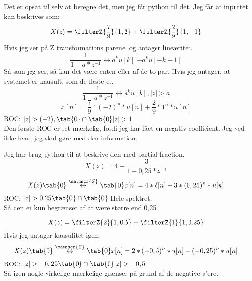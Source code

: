 \begin{Opgaver}
\begin{kapitel}[Z transformation]
\begin{Opgave}
            \begin{Udklip}
                \begin{UnderOpgave}[\text{$X(z) = \filterZ{1, -1/3}{1, 1, -2}$, ROC er hele spektret?}]
                    Det er opsat til selv at beregne det, men jeg får python til det. 
                    Jeg får at inputtet kan beskrives som: 
                    \[X(z) = \filterZ{\frac{7}{9}}{1, 2} + \filterZ{\frac{2}{9}}{1, -1}\]
                    Hvis jeg ser på Z transformations parene, og antager lineæritet. \\
                    \[\frac{1}{1 - a*z^{-1}} \leftrightarrow a^ku[k] | -a^ku[-k-1]\] 
                    Så som jeg ser, så kan det være enten eller af de to par. Hvis jeg antager, at systemet er kausult, som de fleste er. 
                    \[\frac{1}{1 - a*z^{-1}} \leftrightarrow a^ku[k], |z| > a\]
                    \[x[n] = \frac{7}{9} * (-2)^n * u[n] + \frac{2}{9} * 1^n * u[n] \]
                    ROC: $|z| > (-2),\tab{0}\cap\tab{0} |z| > 1$\\
                    Den første ROC er ret mærkelig, fordi jeg har fået en negativ coefficient. Jeg ved ikke hvad jeg skal gøre med den information.
                \end{UnderOpgave}
                \begin{UnderOpgave}[\text{$X(z) = \filterZ{1, -1}{1, 0.25}, \tab{0}$x[n] is causal}]
                    Jeg har brug python til at beskrive den med partial fraction.
                    \[X(z) = 4 - \frac{3}{1 - 0,25*z^{-1}}\]
                    \[X(z) \tab{0}\overset{\mathscr{Z}}{\leftrightarrow}\tab{0} x[n] = 4 * \delta[n] -  3*(0,25)^n * u[n]\]
                    ROC: $|z| > 0.25 \tab{0}\cap\tab{0}$ Hele spektret.\\ Så den er kun begrænset af at være større end 0,25. 
                \end{UnderOpgave}
                \begin{UnderOpgave}[\text{$X(z) = \filterZ{1}{1, 0.75, 0.125},\tab{0}$ x[n] is absolutely summable}]
                    \[X(z) = \filterZ{2}{1, 0.5} - \filterZ{1}{1, 0.25}\]
                    Hvis jeg antager kausulitet igen: 
                    \[X(z) \tab{0}\overset{\mathscr{Z}}{\leftrightarrow}\tab{0} x[n] = 2 * (-0,5)^n * u[n] - (-0,25)^n * u[n]\]
                    ROC: $|z| > -0,25 \tab{0}\cap\tab{0} |z| > -0,5$ \\
                    Så igen nogle virkelige mærkelige grænser på grund af de negative a'ere. 
                    \\

\end{UnderOpgave}
\end{Udklip}
\end{Opgave}
\end{kapitel}
\end{Opgaver}
